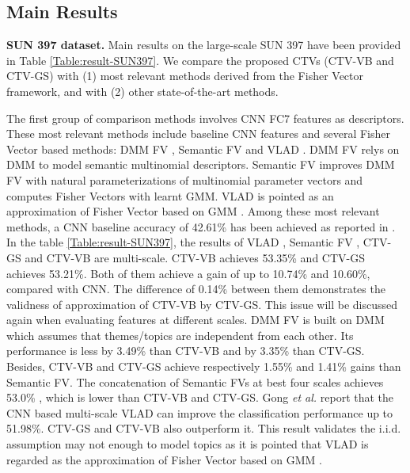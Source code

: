 \documentclass[journal]{IEEEtran}
\begin{document}

\subsection{Main Results}
\textbf{SUN 397 dataset.}
Main results on the large-scale SUN 397 have been provided in Table \ref{Table:result-SUN397}. We compare the proposed CTVs (CTV-VB and CTV-GS) with (1) most relevant methods derived from the Fisher Vector framework, and with (2) other state-of-the-art methods.

The first group of comparison methods involves CNN FC7 features as descriptors. These most relevant methods include baseline CNN features and several Fisher Vector based methods: DMM FV \cite{dixit2015scene}, Semantic FV \cite{dixit2015scene} and VLAD \cite{gong2014multi}. DMM FV relys on DMM to model semantic multinomial descriptors. Semantic FV improves DMM FV with natural parameterizations of multinomial parameter vectors and computes Fisher Vectors with learnt GMM. VLAD is pointed as an approximation of Fisher Vector based on GMM \cite{dixit2015scene}. Among these most relevant methods, a CNN baseline accuracy of 42.61\% has been achieved as reported in \cite{zhou2014learning}.
In the table \ref{Table:result-SUN397}, the results of VLAD \cite{gong2014multi}, Semantic FV \cite{dixit2015scene}, CTV-GS and CTV-VB are multi-scale. CTV-VB achieves 53.35\% and CTV-GS achieves 53.21\%. Both of them achieve a gain of up to 10.74\% and 10.60\%, compared with CNN. The difference of 0.14\% between them demonstrates the validness of approximation of CTV-VB by CTV-GS. This issue will be discussed again when evaluating features at different scales. DMM FV \cite{dixit2015scene} is built on DMM which assumes that themes/topics are independent from each other. Its performance is less by 3.49\% than CTV-VB and by 3.35\% than CTV-GS. Besides, CTV-VB and CTV-GS achieve respectively 1.55\% and 1.41\% gains than Semantic FV. The concatenation of Semantic FVs at best four scales achieves 53.0\% \cite{dixit2015scene}, which is lower than CTV-VB and CTV-GS. Gong \emph{et al.} \cite{gong2014multi} report that the CNN based multi-scale VLAD can improve the classification performance up to 51.98\%. CTV-GS and CTV-VB also outperform it. This result validates the i.i.d. assumption may not enough to model topics as it is pointed that VLAD is regarded as the approximation of Fisher Vector based on GMM \cite{dixit2015scene}.
\end{document}
